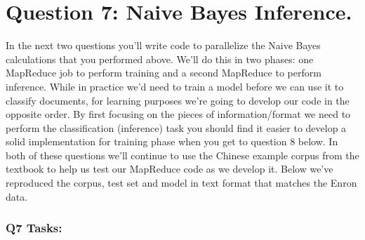 \documentclass[11pt]{article}
\begin{document}
    \section{Question 7: Naive Bayes
Inference.}\label{question-7-naive-bayes-inference.}

In the next two questions you'll write code to parallelize the Naive
Bayes calculations that you performed above. We'll do this in two
phases: one MapReduce job to perform training and a second MapReduce to
perform inference. While in practice we'd need to train a model before
we can use it to classify documents, for learning purposes we're going
to develop our code in the opposite order. By first focusing on the
pieces of information/format we need to perform the classification
(inference) task you should find it easier to develop a solid
implementation for training phase when you get to question 8 below. In
both of these questions we'll continue to use the Chinese example corpus
from the textbook to help us test our MapReduce code as we develop it.
Below we've reproduced the corpus, test set and model in text format
that matches the Enron data.

\subsubsection{Q7 Tasks:}\label{q7-tasks}
\end{document}
